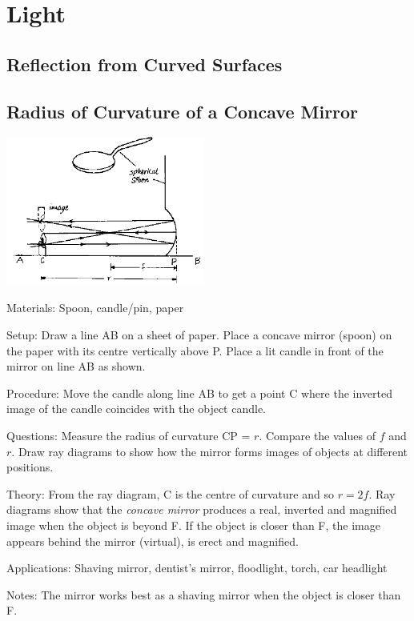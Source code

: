 \section{Light}

\begin{multicols}{2}


\section*{Reflection from Curved Surfaces}


\subsection{Radius of Curvature of a Concave Mirror}

\begin{center}
\includegraphics[width=0.49\textwidth]{./img/source/radius-concave.png}
\end{center}

\begin{description*}
\item[Materials:]{Spoon, candle/pin, paper}
\item[Setup:]{Draw a line AB on a sheet of paper. Place a concave mirror (spoon) on the paper with its centre vertically above P. Place a lit candle in front of the mirror on line AB as shown.}
\item[Procedure:]{Move the candle along line AB to get a point C where the inverted image of the candle coincides with the object candle.}
\item[Questions:]{Measure the radius of curvature CP = $r$. Compare the values of $f$ and $r$. Draw ray diagrams to show how the mirror forms images of objects at different positions.}
\item[Theory:]{From the ray diagram, C is the centre of curvature and so $r=2f$. Ray diagrams show that the \emph{concave mirror} produces a real, inverted and magnified image when the object is beyond F. If the object is closer than F, the image appears behind the mirror (virtual), is erect and magnified.}
\item[Applications:]{Shaving mirror, dentist's mirror, floodlight, torch, car headlight}
\item[Notes:]{The mirror works best as a shaving mirror when the object is closer than F.}
\end{description*}


\end{multicols}
